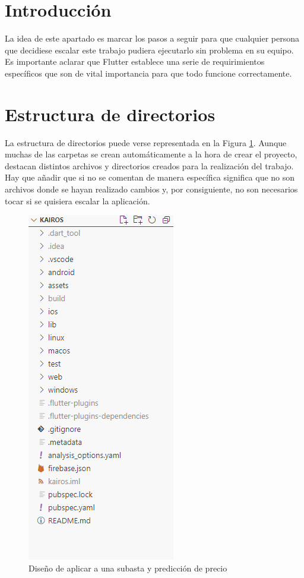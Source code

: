 
\section{Introducción}

	La idea de este apartado es marcar los pasos a seguir para que cualquier persona que decidiese escalar este trabajo pudiera ejecutarlo sin problema en su equipo. Es importante aclarar que Flutter establece una serie de requirimientos específicos que son de vital importancia para que todo funcione correctamente.

\section{Estructura de directorios}

	La estructura de directorios puede verse representada en la Figura \ref{fig:directorios}. Aunque muchas de las carpetas se crean automáticamente a la hora de crear el proyecto, destacan distintos archivos y directorios creados para la realización del trabajo. Hay que añadir que si no se comentan de manera específica significa que no son archivos donde se hayan realizado cambios y, por consiguiente, no son necesarios tocar si se quisiera escalar la aplicación.
	
\begin{figure}[H]
    \centering
    \includegraphics[width=0.5\linewidth]{img/directorios.png}
    \caption{Diseño de aplicar a una subasta y predicción de precio}
    \label{fig:directorios}
\end{figure}

